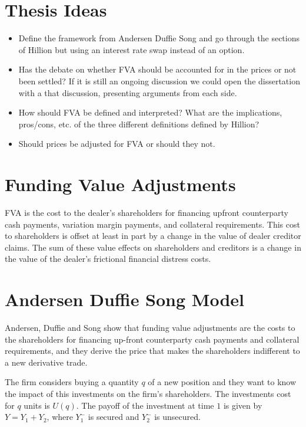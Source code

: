\documentclass[10pt,a4paper]{article}
\begin{document}
    \tableofcontents
    \section{Thesis Ideas}
        \begin{itemize}
            \item Define the framework from Andersen Duffie Song and go through the sections of Hillion but using an interest rate swap instead of an option.
            \item Has the debate on whether FVA should be accounted for in the prices or not been settled? If it is still an ongoing discussion we could open the dissertation with a that discussion, presenting arguments from each side. 
            \item How should FVA be defined and interpreted? What are the implications, pros/cons, etc. of the three different definitions defined by Hillion?
            \item Should prices be adjusted for FVA or should they not.
        \end{itemize}

    \section{Funding Value Adjustments}
        FVA is the cost to the dealer's shareholders for financing upfront counterparty cash payments, variation margin payments, and collateral requirements. This cost to shareholders is offset at least in part by a change in the value of dealer creditor claims. The sum of these value effects on shareholders and creditors is a change in the value of the dealer's frictional financial distress costs. 

    \section{Andersen Duffie Song Model}

        Andersen, Duffie and Song show that funding value adjustments are the costs to the shareholders for financing up-front counterparty cash payments and collateral requirements, and they derive the price that makes the shareholders indifferent to a new derivative trade.
        
        The firm considers buying a quantity $q$ of a new position and they want to know the impact of this investments on the firm's shareholders. The investments cost for $q$ units is $U(q)$. The payoff of the investment at time $1$ is given by $Y=Y_{1} + Y_{2}$, where $Y_{1}^{-}$ is secured and $Y_{2}^{-}$ is unsecured.
\end{document}
